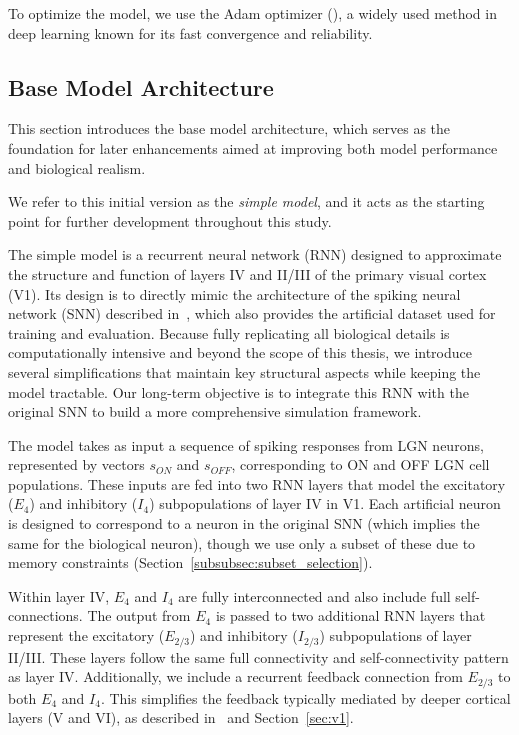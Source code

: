 To optimize the model, we use the Adam optimizer (\citet{kingma2017adammethodstochasticoptimization}), a widely used method in deep learning known for its fast convergence and reliability.

\subsection{Base Model Architecture}
\label{subsec:base_model_architecture}

This section introduces the base model architecture, which serves as the foundation for later enhancements aimed at improving both model performance and biological realism.

We refer to this initial version as the \emph{simple model}, and it acts as the starting point for further development throughout this study.

The simple model is a recurrent neural network (RNN) designed to approximate the structure and function of layers IV and II/III of the primary visual cortex (V1). Its design is to directly mimic the architecture of the spiking neural network (SNN) described in~\citet{antolik2024comprehensive}, which also provides the artificial dataset used for training and evaluation. Because fully replicating all biological details is computationally intensive and beyond the scope of this thesis, we introduce several simplifications that maintain key structural aspects while keeping the model tractable. Our long-term objective is to integrate this RNN with the original SNN to build a more comprehensive simulation framework.

The model takes as input a sequence of spiking responses from LGN neurons, represented by vectors $s_{ON}$ and $s_{OFF}$, corresponding to ON and OFF LGN cell populations. These inputs are fed into two RNN layers that model the excitatory ($E_4$) and inhibitory ($I_4$) subpopulations of layer IV in V1. Each artificial neuron is designed to correspond to a neuron in the original SNN (which implies the same for the biological neuron), though we use only a subset of these due to memory constraints (Section~\ref{subsubsec:subset_selection}).

Within layer IV, $E_4$ and $I_4$ are fully interconnected and also include full self-connections. The output from $E_4$ is passed to two additional RNN layers that represent the excitatory ($E_{2/3}$) and inhibitory ($I_{2/3}$) subpopulations of layer II/III. These layers follow the same full connectivity and self-connectivity pattern as layer IV. Additionally, we include a recurrent feedback connection from $E_{2/3}$ to both $E_4$ and $I_4$. This simplifies the feedback typically mediated by deeper cortical layers (V and VI), as described in~\citet{antolik2024comprehensive} and Section~\ref{sec:v1}.

